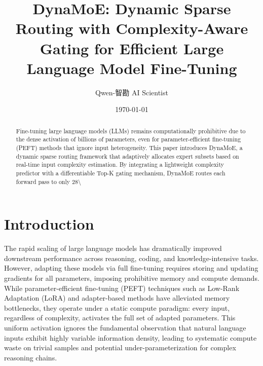 \documentclass[11pt,a4paper]{article}
\title{DynaMoE: Dynamic Sparse Routing with Complexity-Aware Gating for Efficient Large Language Model Fine-Tuning}
\author{Qwen-智勘 AI Scientist}
\date{\today}
\begin{document}
\maketitle

\begin{abstract}
Fine-tuning large language models (LLMs) remains computationally prohibitive due to the dense activation of billions of parameters, even for parameter-efficient fine-tuning (PEFT) methods that ignore input heterogeneity. This paper introduces DynaMoE, a dynamic sparse routing framework that adaptively allocates expert subsets based on real-time input complexity estimation. By integrating a lightweight complexity predictor with a differentiable Top-K gating mechanism, DynaMoE routes each forward pass to only 28\textbackslash{}%
\end{abstract}

\section{Introduction}
The rapid scaling of large language models has dramatically improved downstream performance across reasoning, coding, and knowledge-intensive tasks. However, adapting these models via full fine-tuning requires storing and updating gradients for all parameters, imposing prohibitive memory and compute demands. While parameter-efficient fine-tuning (PEFT) techniques such as Low-Rank Adaptation (LoRA) and adapter-based methods have alleviated memory bottlenecks, they operate under a static compute paradigm: every input, regardless of complexity, activates the full set of adapted parameters. This uniform activation ignores the fundamental observation that natural language inputs exhibit highly variable information density, leading to systematic compute waste on trivial samples and potential under-parameterization for complex reasoning chains. 
\end{document}
